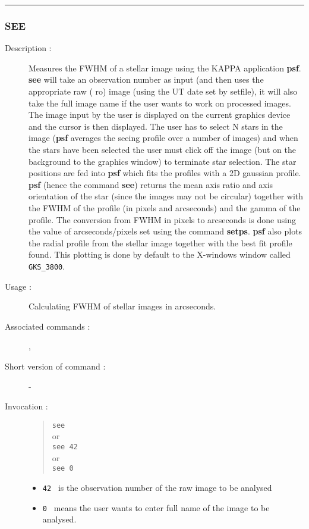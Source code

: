 \hrule
\subsubsection*{\label{SEE}SEE}

\begin{description}

\item[Description :] Measures the FWHM of a stellar image
using the KAPPA application {\bf psf}.  {\bf see} will take an
observation number as input (and then uses the appropriate raw ({\sc
ro}) image (using the UT date set by setfile), it will also take the
full image name if the user wants to work on processed images.  The
image input by the user is displayed on the current graphics device and
the cursor is then displayed.  The user has to select N stars in the
image ({\bf psf} averages the seeing profile over a number of images)
and when the stars have been selected the user must click off the image
(but on the background to the graphics window) to terminate star
selection.  The star positions are fed into {\bf psf} which fits the
profiles with a 2D gaussian profile.  {\bf psf} (hence the command {\bf see})
returns the mean axis ratio and axis orientation of the star (since the
images may not be circular) together with the FWHM of the profile (in
pixels and arcseconds) and the gamma of the profile. The conversion
from FWHM in pixels to arcseconds is done using the value of
arcseconds/pixels set using the command {\bf setps}.  {\bf psf} also plots
the radial profile from the stellar image together with the best fit
profile found.  This plotting is done by default to the X-windows
window called {\tt GKS\_3800}.

\item[Usage :] Calculating FWHM of stellar images in arcseconds.

\item[Associated commands :] {\tt {}},
{\tt {}}

\item[Short version of command :] -
\item[Invocation :]

\begin{quote}{\tt  see }\\
or \\
{\tt see 42 }\\
or \\
{\tt see 0 }
\end{quote}

\begin{itemize}
\item {\tt 42 } is the observation number of the raw image to be analysed
\item {\tt 0 } means the user wants to enter full name of the image to
 be analysed.
\end{itemize}

\end{description}

